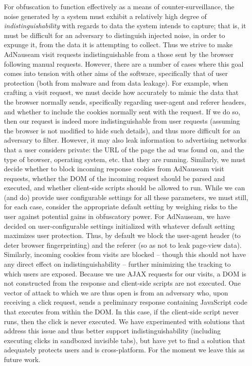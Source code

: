 \documentclass[conference]{IEEEtran}
\begin{document}
For obfuscation to function effectively as a means of counter-surveillance, the noise generated by a system must exhibit a relatively high degree of \emph{indistinguishability} with regards to data the system intends to capture; that is, it must be difficult for an adversary to distinguish injected noise, in order to expunge it, from the data it is attempting to collect. \cite{Gervais,Balsa} Thus we strive to make AdNauseam visit requests indistinguishable from a those sent by the browser following manual requests. However, there are a number of cases where this goal comes into tension with other aims of the software, specifically that of user protection (both from malware and from data leakage). For example, when crafting a visit request, we must decide how accurately to mimic the data that the browser normally sends, specifically regarding user-agent and referer headers, and whether to include the cookies normally sent with the request. If we do so, then our request is indeed more indistinguishable from user requests (assuming the browser is not modified to hide such details), and thus more difficult for an adversary to filter. However, it may also leak information to advertising networks that a user considers private: the URL of the page the ad was found on, and the type of browser, operating system, etc. that they are running. Similarly, we must decide whether to block incoming response cookies from AdNauseam visit requests, whether the DOM of the incoming request should be parsed and executed, and whether client-side scripts should be allowed to run. While we can (and do) provide user configurable settings for all these parameters, we must still, for each case, consider the appropriate default setting by weighing risks to the user against potential gains in obfuscatory power. For AdNauseam, we have decided on user-configurable settings initialized with whatever default setting maximizes user protection. Thus, by default we block the user-agent header (to deter browser fingerprinting) and the referer (so as not to leak page-view data). Similarly, incoming cookies from visits are blocked -- though this should not have any direct effect on indistinguishability -- further minimizing the tracking to which users are exposed. Because we use AJAX requests for our visits, a DOM is not constructed from the response and client-side scripts are not executed. One vector of attack to which we are thus open is from an adversary who, upon receiving a click request, sends a preliminary response containing JavaScript code that executes from within the DOM. In this case, if the client-side script never runs, then the click is never executed. We have experimented with solutions that address this issue and thus better support indistinguishability (including executing clicks in sandboxed invisible tabs), but have yet to find a solution that adequately protects users and is cross-platform. For the moment we leave this as future work.
\end{document}
